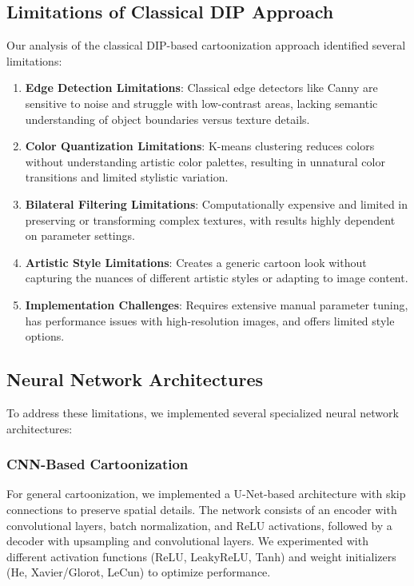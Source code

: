 \documentclass[conference]{IEEEtran}
\begin{document}
\subsection{Limitations of Classical DIP Approach}
Our analysis of the classical DIP-based cartoonization approach identified several limitations:

\begin{enumerate}
    \item \textbf{Edge Detection Limitations}: Classical edge detectors like Canny are sensitive to noise and struggle with low-contrast areas, lacking semantic understanding of object boundaries versus texture details.
    \item \textbf{Color Quantization Limitations}: K-means clustering reduces colors without understanding artistic color palettes, resulting in unnatural color transitions and limited stylistic variation.
    \item \textbf{Bilateral Filtering Limitations}: Computationally expensive and limited in preserving or transforming complex textures, with results highly dependent on parameter settings.
    \item \textbf{Artistic Style Limitations}: Creates a generic cartoon look without capturing the nuances of different artistic styles or adapting to image content.
    \item \textbf{Implementation Challenges}: Requires extensive manual parameter tuning, has performance issues with high-resolution images, and offers limited style options.
\end{enumerate}

\subsection{Neural Network Architectures}
To address these limitations, we implemented several specialized neural network architectures:

\subsubsection{CNN-Based Cartoonization}
For general cartoonization, we implemented a U-Net-based architecture with skip connections to preserve spatial details. The network consists of an encoder with convolutional layers, batch normalization, and ReLU activations, followed by a decoder with upsampling and convolutional layers. We experimented with different activation functions (ReLU, LeakyReLU, Tanh) and weight initializers (He, Xavier/Glorot, LeCun) to optimize performance.
\end{document}
